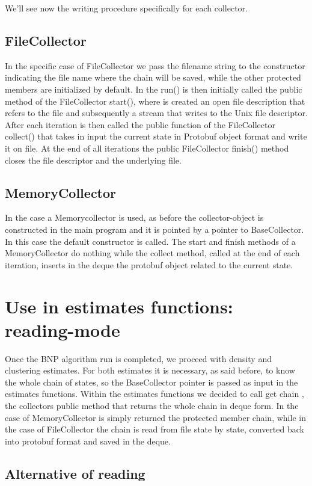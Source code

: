 We'll see now the writing procedure specifically for each collector. 

\subsection{FileCollector}

In the specific case of FileCollector we pass the filename string to the constructor indicating the file name where the chain will be saved, while the other protected members are initialized by default. In the run() is then initially called the public method of the FileCollector start(), where is created an open file description that refers to the file and subsequently a stream that writes to the Unix file descriptor. After each iteration is then called the public function of the FileCollector collect() that takes in input the current state in Protobuf object format and write it on file. At the end of all iterations the public FileCollector finish() method closes the file descriptor and the underlying file. 

\subsection{MemoryCollector}
In the case a Memorycollector is used, as before the collector-object is constructed in the main program and it is pointed by a pointer to BaseCollector. In this case the default constructor is called. The start and finish methods of a MemoryCollector do nothing while the collect method, called at the end of each iteration, inserts in the deque the protobuf object related to the current state.

\section{Use in estimates functions: reading-mode}
Once the BNP algorithm run is completed, we proceed with density and clustering estimates. For both estimates it is necessary, as said before, to know the whole chain of states, so the BaseCollector pointer is passed as input in the estimates functions. Within the estimates functions we decided to call get chain , the collectors public method that returns the whole chain in deque form. In the case of MemoryCollector is simply returned the protected member chain, while in the case of FileCollector the chain is read from file state by state, converted back into protobuf format and saved in the deque.

\subsection{Alternative of reading}

